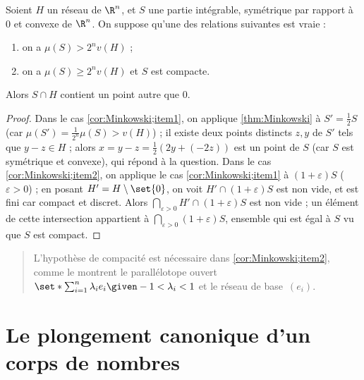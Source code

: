 \documentclass[11pt, useosf,
  title in boldface,
  theorem in new line,
  theorem numbering = section,
  number theorems separately,
]{simplivre}
\begin{document}
    \begin{corollary}\label{cor:Minkowski}
        Soient \( H \) un réseau de \( \R^n \), et \( S \) une partie intégrable, symétrique par rapport à \( 0 \) et convexe de \( \R^n \). On suppose qu'une des relations suivantes est vraie :
        \begin{enumerate}
            \item \label{cor:Minkowski;item1} on a \( \mu(S) > 2^n v(H) \) ;
            \item \label{cor:Minkowski;item2} on a \( \mu(S) \geqslant 2^n v(H) \) et \( S \) est compacte.
        \end{enumerate}
        Alors \( S \cap H \) contient un point autre que \( 0 \).
    \end{corollary}
    \begin{proof}
        Dans le cas \ref{cor:Minkowski;item1}, on applique \cref{thm:Minkowski} à \( S' = \frac{1}{2} S \) (car \( \mu(S') = \frac{1}{2^n} \mu(S) > v(H) \)) ; il existe deux points distincts \( z, y \) de \( S' \) tels que \( y-z \in H \) ; alors \( x = y-z = \frac{1}{2}(2y+(-2z)) \) est un point de \( S \) (car \( S \) est symétrique et convexe), qui répond à la question. Dans le cas \ref{cor:Minkowski;item2}, on applique le cas \ref{cor:Minkowski;item1} à \( (1+\varepsilon)S \) (\( \varepsilon > 0 \)) ; en posant \( H' = H \setminus \set{0} \), on voit \( H' \cap (1+\varepsilon)S \) est non vide, et est fini car compact et discret. Alors \( \bigcap_{\varepsilon>0} H' \cap (1+\varepsilon)S \) est non vide ; un élément de cette intersection appartient à \( \bigcap_{\varepsilon>0} (1+\varepsilon)S \), ensemble qui est égal à \( S \) vu que \( S \) est compact.
    \end{proof}

    \begin{quote}
        L'hypothèse de compacité est nécessaire dans \ref{cor:Minkowski;item2}, comme le montrent le parallélotope ouvert \( \set*{ \sum_{i=1}^n \lambda_i e_i \given -1 < \lambda_i < 1 } \) et le réseau de base~\( (e_i) \).
    \end{quote}

\section{Le plongement canonique d'un corps de nombres}\label{sec:le plongement canonique d'un corps de nombres}
\end{document}
